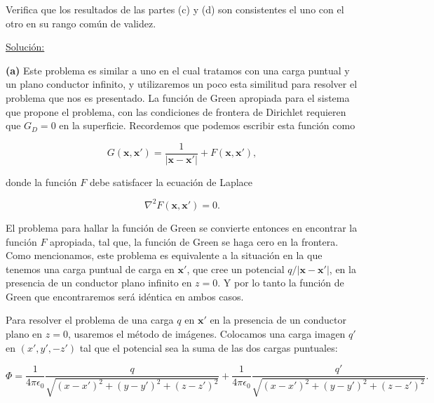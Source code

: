 \documentclass[a4paper,11pt]{article}
\numberwithin{equation}{section}
\begin{document}
Verifica que los resultados de las partes (c) y (d) son consistentes el uno 
con el otro en su rango común de validez.

\vspace{.3cm}

\underline{Solución:} \vspace{.3cm}

\textbf{(a)} Este problema es similar a uno en el cual tratamos con una carga puntual y un plano 
conductor infinito, y utilizaremos un poco esta similitud para resolver el problema 
que nos es presentado. La función de Green apropiada para el sistema que propone el 
problema, con las condiciones de frontera de Dirichlet requieren que $G_D = 0$ en la 
superficie. Recordemos que podemos escribir esta función como 

\begin{equation}
 G(\mathbf{x},\mathbf{x}') = \frac{1}{|\mathbf{x} - \mathbf{x}'|} + 
 F(\mathbf{x},\mathbf{x}'),
\end{equation}

donde la función $F$ debe satisfacer la ecuación de Laplace 

\begin{equation}
 \nabla^2F(\mathbf{x},\mathbf{x}') = 0.
\end{equation}

El problema para hallar la función de Green se convierte entonces en encontrar 
la función $F$ apropiada, tal que, la función de Green se haga cero en la frontera. 
Como mencionamos, este problema es equivalente a la situación en la que tenemos una 
carga puntual de carga en $\mathbf{x}'$, que cree un potencial $q/|\mathbf{x}-
\mathbf{x}'|$, en la presencia de un conductor plano infinito en $z = 0$. Y por lo 
tanto la función de Green que encontraremos será idéntica en ambos casos. 

\vspace{.3cm}

Para resolver el problema de una carga $q$ en $\mathbf{x}'$ en la presencia de un 
conductor plano en $z = 0$, usaremos el método de imágenes. Colocamos una carga 
imagen $q'$ en $(x',y',-z')$ tal que el potencial sea la suma de las dos cargas 
puntuales:

\begin{equation*}
 \Phi = \frac{1}{4\pi\epsilon_0}\frac{q}{\sqrt{(x-x')^2 + (y-y')^2 + (z-z')^2}} + 
 \frac{1}{4\pi\epsilon_0}\frac{q'}{\sqrt{(x-x')^2 + (y-y')^2 + (z-z')^2}}.
\end{equation*}
\end{document}
